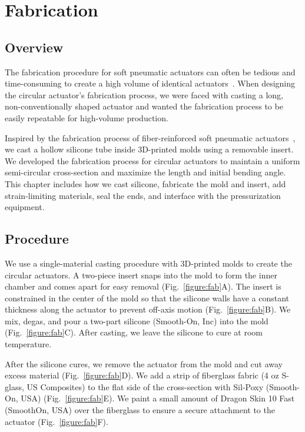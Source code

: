 \chapter{Fabrication}
\label{chapter:fabrication}

\section{Overview}

The fabrication procedure for soft pneumatic actuators can often be tedious and time-consuming to create a high volume of identical actuators~\cite{hu_precurved_2022}. When designing the circular actuator's fabrication process, we were faced with casting a long, non-conventionally shaped actuator and wanted the fabrication process to be easily repeatable for high-volume production. 

Inspired by the fabrication process of fiber-reinforced soft pneumatic actuators~\cite{galloway_mechanically_2013, polygerinos_modeling_2015}, we cast a hollow silicone tube inside 3D-printed molds using a removable insert. We developed the fabrication process for circular actuators to maintain a uniform semi-circular cross-section and maximize the length and initial bending angle. This chapter includes how we cast silicone, fabricate the mold and insert, add strain-limiting materials, seal the ends, and interface with the pressurization equipment.

\clearpage
\section{Procedure}

We use a single-material casting procedure with 3D-printed molds to create the circular actuators. A two-piece insert snaps into the mold to form the inner chamber and comes apart for easy removal (Fig.~\ref{figure:fab}A). The insert is constrained in the center of the mold so that the silicone walls have a constant thickness along the actuator to prevent off-axis motion (Fig.~\ref{figure:fab}B). We mix, degas, and pour a two-part silicone (Smooth-On, Inc) into the mold (Fig.~\ref{figure:fab}C). After casting, we leave the silicone to cure at room temperature. 

After the silicone cures, we remove the actuator from the mold and cut away excess material (Fig.~\ref{figure:fab}D). We add a strip of fiberglass fabric (4 oz S-glass, US Composites) to the flat side of the cross-section with Sil-Poxy (Smooth-On, USA) (Fig.~\ref{figure:fab}E). We paint a small amount of Dragon Skin 10 Fast (SmoothOn, USA) over the fiberglass to ensure a secure attachment to the actuator (Fig.~\ref{figure:fab}F). 


